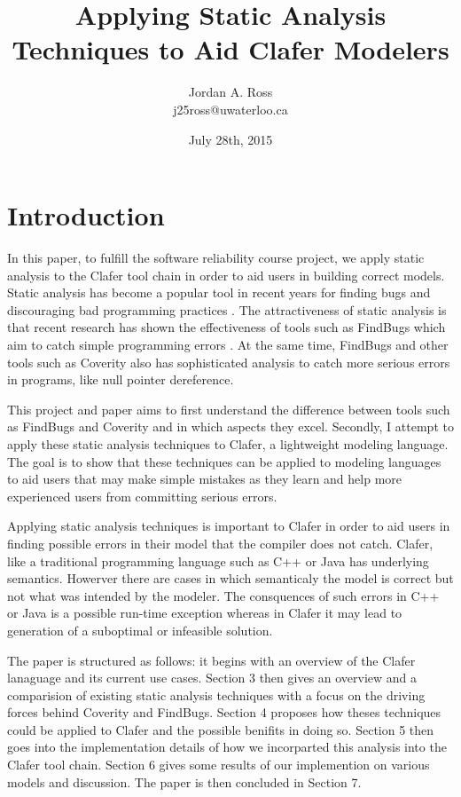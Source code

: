 \documentclass[10pt,oneside]{IEEEtran}
\title{Applying Static Analysis Techniques to Aid Clafer Modelers}
\author{Jordan A. Ross \\j25ross@uwaterloo.ca}
\date{July 28th, 2015}
\begin{document}
\maketitle
\newpage

\section{Introduction}
In this paper, to fulfill the software reliability course project, we apply static analysis to the Clafer tool chain in order to aid users in building correct models. Static analysis has become a popular
tool in recent years for finding bugs and discouraging bad programming practices \cite{8}.
The attractiveness of static analysis is that recent research has shown the effectiveness of tools
such as FindBugs which aim to catch simple programming errors \cite{6}. At the same time, FindBugs
and other tools such as Coverity also has sophisticated analysis to catch more serious errors in programs, like null pointer dereference.

This project and paper aims to first understand the difference between tools such as FindBugs and Coverity
and in which aspects they excel. Secondly, I attempt to apply these static analysis techniques to Clafer, a
lightweight modeling language. The goal is to show that these techniques can be applied to modeling languages
to aid users that may make simple mistakes as they learn and help more experienced users from committing serious
errors.

Applying static analysis techniques is important to Clafer in order to aid users in finding possible errors in their model that the compiler does not catch. Clafer, like a traditional programming language such as C++ or Java has underlying semantics. Howerver there are cases in which semanticaly the model is correct but not what was intended by the modeler. The consquences of such errors in C++ or Java is a possible run-time exception whereas in Clafer it may lead to generation of a suboptimal or infeasible solution.

The paper is structured as follows: it begins with an overview of the Clafer lanaguage and its current use
cases. Section 3 then gives an overview and a comparision of existing static analysis techniques with a focus
on the driving forces behind Coverity and FindBugs. Section 4 proposes how theses techniques could be applied
to Clafer and the possible benifits in doing so. Section 5 then goes into the implementation details of how
we incorparted this analysis into the Clafer tool chain. Section 6 gives some results of our implemention on
various models and discussion. The paper is then concluded in Section 7.
\end{document}
